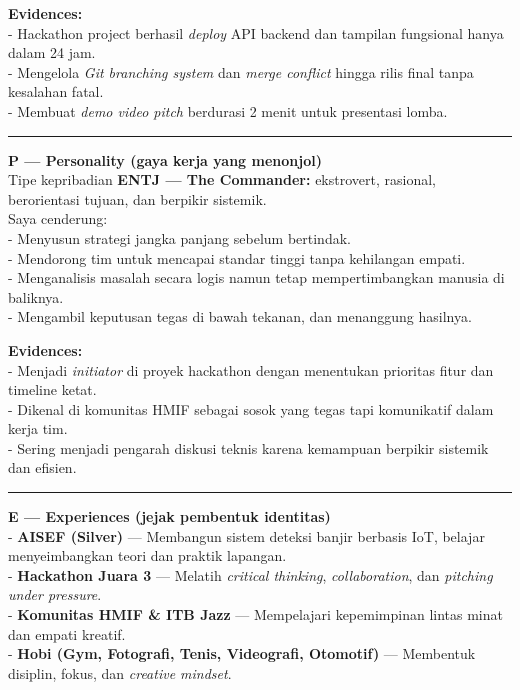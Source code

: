 \documentclass[
  letterpaper,
  DIV=11,
  numbers=noendperiod]{scrreprt}
\begin{document}
\textbf{Evidences:}\\
- Hackathon project berhasil \emph{deploy} API backend dan tampilan
fungsional hanya dalam 24 jam.\\
- Mengelola \emph{Git branching system} dan \emph{merge conflict} hingga
rilis final tanpa kesalahan fatal.\\
- Membuat \emph{demo video pitch} berdurasi 2 menit untuk presentasi
lomba.

\begin{center}\rule{0.5\linewidth}{0.5pt}\end{center}

\textbf{P --- Personality (gaya kerja yang menonjol)}\\
Tipe kepribadian \textbf{ENTJ --- The Commander:} ekstrovert, rasional,
berorientasi tujuan, dan berpikir sistemik.\\
Saya cenderung:\\
- Menyusun strategi jangka panjang sebelum bertindak.\\
- Mendorong tim untuk mencapai standar tinggi tanpa kehilangan empati.\\
- Menganalisis masalah secara logis namun tetap mempertimbangkan manusia
di baliknya.\\
- Mengambil keputusan tegas di bawah tekanan, dan menanggung hasilnya.

\textbf{Evidences:}\\
- Menjadi \emph{initiator} di proyek hackathon dengan menentukan
prioritas fitur dan timeline ketat.\\
- Dikenal di komunitas HMIF sebagai sosok yang tegas tapi komunikatif
dalam kerja tim.\\
- Sering menjadi pengarah diskusi teknis karena kemampuan berpikir
sistemik dan efisien.

\begin{center}\rule{0.5\linewidth}{0.5pt}\end{center}

\textbf{E --- Experiences (jejak pembentuk identitas)}\\
- \textbf{AISEF (Silver)} --- Membangun sistem deteksi banjir berbasis
IoT, belajar menyeimbangkan teori dan praktik lapangan.\\
- \textbf{Hackathon Juara 3} --- Melatih \emph{critical thinking},
\emph{collaboration}, dan \emph{pitching under pressure}.\\
- \textbf{Komunitas HMIF \& ITB Jazz} --- Mempelajari kepemimpinan
lintas minat dan empati kreatif.\\
- \textbf{Hobi (Gym, Fotografi, Tenis, Videografi, Otomotif)} ---
Membentuk disiplin, fokus, dan \emph{creative mindset}.
\end{document}
